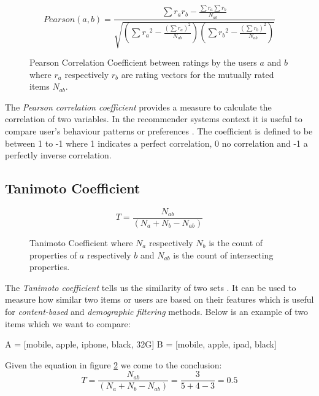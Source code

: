 \begin{figure}[ht]
    \[Pearson(a,b) = \frac{\sum r_ar_b - \frac{\sum r_a \sum r_b}{N_{ab}}}{\sqrt{(\sum {r_a}^{2} - \frac{(\sum r_a)^{2}}{N_{ab}})(\sum {r_b}^{2} - \frac{(\sum r_b)^{2}}{N_{ab}})}}\]
    \caption[Pearson Correlation Coefficient]{Pearson Correlation Coefficient between ratings by the users \(a\) and \(b\) where \(r_a\) respectively \(r_b\) are rating vectors for the mutually rated items \(N_{ab}\).}
    \label{fig:pearson}
\end{figure}

The \textit{Pearson correlation coefficient} provides a measure to calculate the correlation of two variables. In the recommender systems context it is useful to compare user's behaviour patterns or preferences \cite{segaran07}. The coefficient is defined to be between 1 to -1 where 1 indicates a perfect correlation, 0 no correlation and -1 a perfectly inverse correlation.

\subsection{Tanimoto Coefficient}

\begin{figure}[ht]
    \[T = \frac{N_{ab}}{(N_a + N_b - N_{ab})}\]
    \caption[Tanimoto Coefficient]{Tanimoto Coefficient where \(N_a\) respectively \(N_b\) is the count of properties of \(a\) respectively \(b\) and \(N_{ab}\) is the count of intersecting properties.}
    \label{fig:tanimoto}
\end{figure}

The \textit{Tanimoto coefficient} tells us the similarity of two sets \cite{segaran07}. It can be used to measure how similar two items or users are based on their features which is useful for \textit{content-based} and \textit{demographic filtering} methods. Below is an example of two items which we want to compare:

\begin{python}
    A = [mobile, apple, iphone, black, 32G]
    B = [mobile, apple, ipad, black]
\end{python}

Given the equation in figure \ref{fig:tanimoto} we come to the conclusion: \[T = \frac{N_{ab}}{(N_a + N_b - N_{ab})} = \frac{3}{5 + 4 - 3} = 0.5\]



